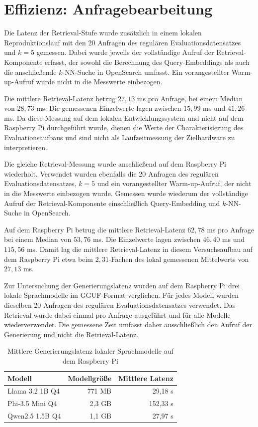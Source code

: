 \section{Effizienz: Anfragebearbeitung}

Die Latenz der Retrieval-Stufe wurde zusätzlich in einem lokalen
Reproduktionslauf mit den 20 Anfragen des regulären Evaluationsdatensatzes
und $k=5$ gemessen. Dabei wurde jeweils der vollständige Aufruf der
Retrieval-Komponente erfasst, der sowohl die Berechnung des Query-Embeddings
als auch die anschließende $k$-NN-Suche in OpenSearch umfasst. Ein
vorangestellter Warm-up-Aufruf wurde nicht in die Messwerte einbezogen.

Die mittlere Retrieval-Latenz betrug $27{,}13$ ms pro Anfrage, bei einem
Median von $28{,}73$ ms. Die gemessenen Einzelwerte lagen zwischen
$15{,}99$ ms und $41{,}26$ ms. Da diese Messung auf dem lokalen
Entwicklungssystem und nicht auf dem Raspberry Pi durchgeführt wurde,
dienen die Werte der Charakterisierung des Evaluationsaufbaus und sind
nicht als Laufzeitmessung der Zielhardware zu interpretieren.

Die gleiche Retrieval-Messung wurde anschließend auf dem Raspberry Pi
wiederholt. Verwendet wurden ebenfalls die 20 Anfragen des regulären
Evaluationsdatensatzes, $k=5$ und ein vorangestellter Warm-up-Aufruf, der
nicht in die Messwerte einbezogen wurde. Gemessen wurde wiederum der
vollständige Aufruf der Retrieval-Komponente einschließlich
Query-Embedding und $k$-NN-Suche in OpenSearch.

Auf dem Raspberry Pi betrug die mittlere Retrieval-Latenz $62{,}78$ ms
pro Anfrage bei einem Median von $53{,}76$ ms. Die Einzelwerte lagen
zwischen $46{,}40$ ms und $115{,}56$ ms. Damit lag die mittlere
Retrieval-Latenz in diesem Versuchsaufbau auf dem Raspberry Pi etwa beim
$2{,}31$-Fachen des lokal gemessenen Mittelwerts von $27{,}13$ ms.

Zur Untersuchung der Generierungslatenz wurden auf dem Raspberry Pi drei
lokale Sprachmodelle im GGUF-Format verglichen. Für jedes Modell wurden
dieselben 20 Anfragen des regulären Evaluationsdatensatzes verwendet.
Das Retrieval wurde dabei einmal pro Anfrage ausgeführt und für alle
Modelle wiederverwendet. Die gemessene Zeit umfasst daher ausschließlich
den Aufruf der Generierung und nicht die Retrieval-Latenz.

\begin{table}[ht]
    \centering
    \caption{Mittlere Generierungslatenz lokaler Sprachmodelle auf dem Raspberry Pi}
    \label{tab:pi-generation-latency}
    \begin{tabular}{lrr}
        \toprule
        Modell & Modellgröße & Mittlere Latenz \\
        \midrule
        Llama 3.2 1B Q4 & 771 MB & 29,18 s \\
        Phi-3.5 Mini Q4 & 2,3 GB & 152,33 s \\
        Qwen2.5 1.5B Q4 & 1,1 GB & 27,97 s \\
        \bottomrule
    \end{tabular}
\end{table}

